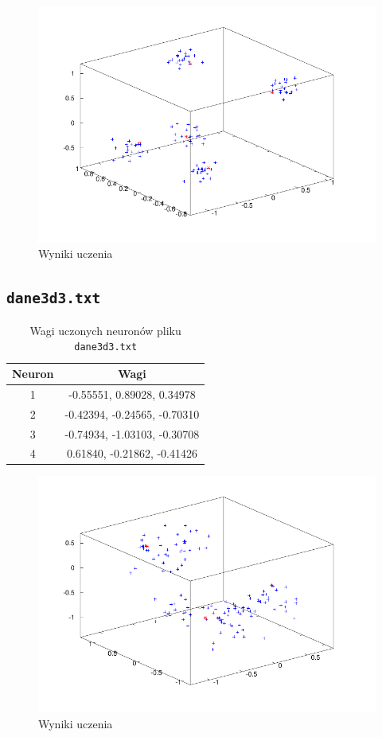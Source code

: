 \documentclass[pointlessnumbers, abstracton, headsepline, a4paper]{scrartcl}
\begin{document}
\begin{figure}[!h]
\centering
\includegraphics[scale=1.0]{src/mydane3d2.pdf}\caption{\label{fig:dane1}Wyniki uczenia}
\end{figure}

\clearpage
\subsection{\texttt{dane3d3.txt}}

\begin{table}[h]
\centering
\begin{tabular}[t]{c|c}
Neuron & Wagi \\
\hline
1&  -0.55551,   0.89028,   0.34978 \\
2&  -0.42394,  -0.24565,  -0.70310 \\
3&  -0.74934,  -1.03103,  -0.30708 \\
4&   0.61840,  -0.21862,  -0.41426 \\
\end{tabular}
\caption{\label{tab:xor}Wagi uczonych neuronów pliku \texttt{dane3d3.txt}}
\end{table}

\begin{figure}[!h]
\centering
\includegraphics[scale=1.0]{src/mydane3d3.pdf}\caption{\label{fig:dane1}Wyniki uczenia}
\end{figure}
\end{document}
